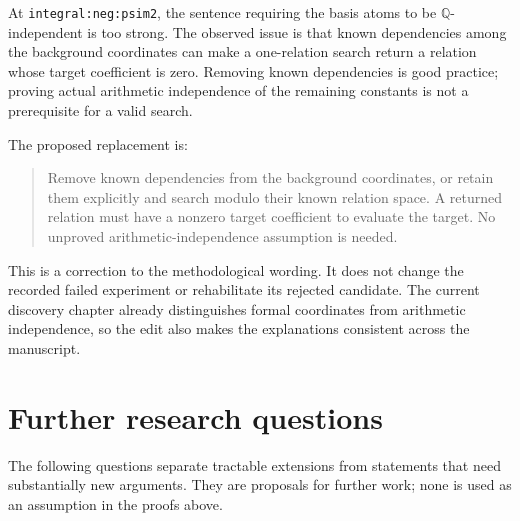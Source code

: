 \documentclass[11pt]{article}
\numberwithin{equation}{section}
\theoremstyle{definition}\newtheorem{definition}[theorem]{Definition}
\theoremstyle{remark}\newtheorem{remark}[theorem]{Remark}
\newcommand{\Q}{\mathbb Q}\newcommand{\T}{\mathbb T}
\begin{document}
At \texttt{integral:neg:psim2}, the sentence requiring the basis atoms
to be $\Q$-independent is too strong. The observed issue is that known
dependencies among the background coordinates can make a one-relation
search return a relation whose target coefficient is zero. Removing
known dependencies is good practice; proving actual arithmetic
independence of the remaining constants is not a prerequisite for a
valid search.

The proposed replacement is:
\begin{quote}
Remove known dependencies from the background coordinates, or retain
them explicitly and search modulo their known relation space. A returned
relation must have a nonzero target coefficient to evaluate the target.
No unproved arithmetic-independence assumption is needed.
\end{quote}
This is a correction to the methodological wording. It does not change
the recorded failed experiment or rehabilitate its rejected candidate.
The current discovery chapter already distinguishes formal coordinates
from arithmetic independence, so the edit also makes the explanations
consistent across the manuscript.

\section{Further research questions}
\label{sec:questions}

The following questions separate tractable extensions from statements
that need substantially new arguments. They are proposals for further
work; none is used as an assumption in the proofs above.
\end{document}
